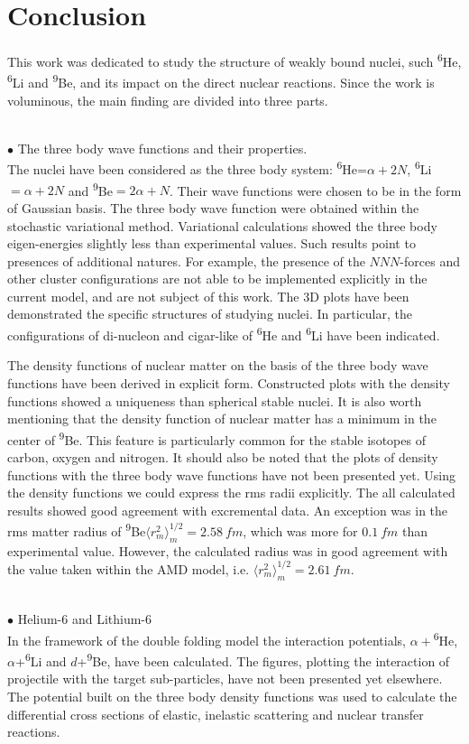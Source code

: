 \documentclass[
12pt, %
oneside, %
english, %
onehalfspacing, %
onehalfspacing, %
headsepline, %
]{MastersDoctoralThesis} %
\newcommand{\he}{\textsuperscript{6}He\xspace}
\newcommand{\li}{\textsuperscript{6}Li\xspace}
\newcommand{\be}{\textsuperscript{9}Be\xspace}
\begin{document}
\chapter*{Conclusion}   

This work was dedicated to study the structure of weakly bound nuclei, such \he, \li and \be, and its impact on the direct nuclear reactions. Since the work is voluminous, the main finding are divided into three parts. 

~\\
$\bullet$ The three body wave functions and their properties.\\
 The nuclei have been considered as the three body system: \he =$\alpha+2N$, \li$=\alpha+2N$ and \be$=2\alpha+N$. Their wave functions were chosen to be in the form of Gaussian basis. The three body wave function were obtained within the stochastic variational method. Variational calculations showed the three body eigen-energies slightly less than experimental values. Such results point to presences of additional natures. For example, the presence of the $NNN$-forces and other cluster configurations are not able to be implemented explicitly in the current model, and are not subject of this work. The 3D plots have been demonstrated the specific structures of studying nuclei. In particular, the configurations of di-nucleon and cigar-like of \he and \li have been indicated.

The density functions of nuclear matter on the basis of the three body wave functions 
have been derived in explicit form. Constructed plots with the density functions showed a uniqueness than spherical stable nuclei. It is also worth mentioning that the density function of nuclear matter has a minimum in the center of \be. This feature is particularly common for the stable isotopes of carbon, oxygen and nitrogen.  
It should also be noted that the plots of density functions with the three body wave functions have not been presented yet. 
Using the density functions we could express the rms radii explicitly. The all calculated results showed good agreement with excremental data. An exception was in the rms matter radius of \be $\langle r^2_m \rangle^{1/2}_m=2.58~fm$, which was more for $0.1~fm$ than experimental value. However, the calculated radius was in good agreement with the value taken within the AMD model, i.e.  $\langle r^2_m \rangle^{1/2}_m=2.61~fm$.

~\\
$\bullet$ Helium-6 and Lithium-6 \\
In the framework of the double folding model the interaction potentials, $\alpha+$\he, $\alpha$+\li and $d$+\be, have been calculated. 
The figures, plotting the interaction of projectile with the target sub-particles, have not been presented yet elsewhere.
The potential built on the three body density functions was used to calculate the differential cross sections of elastic, inelastic scattering and nuclear transfer reactions. 
\end{document}
